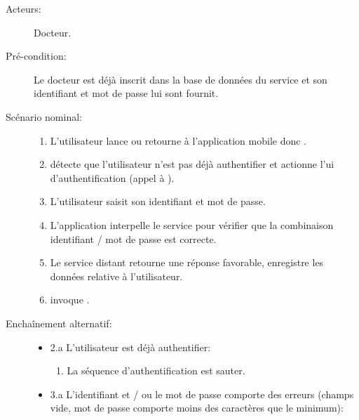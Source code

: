 \begin{description}

\item[Acteurs:] Docteur.

\item[Pré-condition:] Le docteur est déjà inscrit dans la base de données du service et son identifiant et mot de passe lui sont fournit.

\item[Scénario nominal:]

\begin{enumerate}

\item L'utilisateur lance ou retourne à l'application mobile donc .

\item {} détecte que l'utilisateur n'est pas déjà authentifier et actionne l'\gls{ui} d'authentification (appel à ).

\item L'utilisateur saisit son identifiant et mot de passe.

\item L'application interpelle le service pour vérifier que la combinaison identifiant / mot de passe est correcte.

\item Le service distant retourne une réponse favorable,  enregistre les données relative à l'utilisateur.

\item {} invoque .

\end{enumerate}

\item [Enchaînement alternatif:]

\begin{itemize}

\item 2.a L'utilisateur est déjà authentifier:

\begin{enumerate}

\item La séquence d'authentification est sauter.

\end{enumerate}

\item 3.a L’identifiant et / ou le mot de passe comporte des erreurs (champs vide, mot de passe comporte moins des caractères que le minimum):


\end{itemize}
\end{description}
